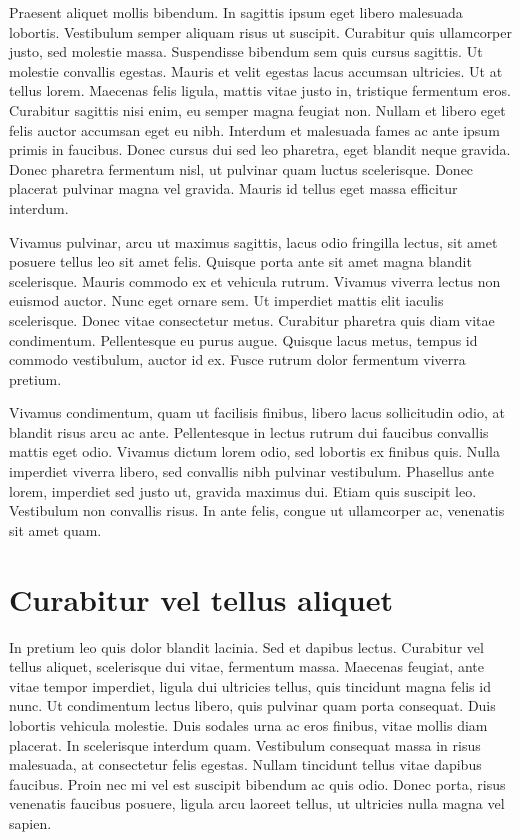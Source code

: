Praesent aliquet mollis bibendum. In sagittis ipsum eget libero malesuada lobortis. Vestibulum semper aliquam risus ut suscipit. Curabitur quis ullamcorper justo, sed molestie massa. Suspendisse bibendum sem quis cursus sagittis. Ut molestie convallis egestas. Mauris et velit egestas lacus accumsan ultricies. Ut at tellus lorem. Maecenas felis ligula, mattis vitae justo in, tristique fermentum eros. Curabitur sagittis nisi enim, eu semper magna feugiat non. Nullam et libero eget felis auctor accumsan eget eu nibh. Interdum et malesuada fames ac ante ipsum primis in faucibus. Donec cursus dui sed leo pharetra, eget blandit neque gravida. Donec pharetra fermentum nisl, ut pulvinar quam luctus scelerisque. Donec placerat pulvinar magna vel gravida. Mauris id tellus eget massa efficitur interdum.

Vivamus pulvinar, arcu ut maximus sagittis, lacus odio fringilla lectus, sit amet posuere tellus leo sit amet felis. Quisque porta ante sit amet magna blandit scelerisque. Mauris commodo ex et vehicula rutrum. Vivamus viverra lectus non euismod auctor. Nunc eget ornare sem. Ut imperdiet mattis elit iaculis scelerisque. Donec vitae consectetur metus. Curabitur pharetra quis diam vitae condimentum. Pellentesque eu purus augue. Quisque lacus metus, tempus id commodo vestibulum, auctor id ex. Fusce rutrum dolor fermentum viverra pretium.

Vivamus condimentum, quam ut facilisis finibus, libero lacus sollicitudin odio, at blandit risus arcu ac ante. Pellentesque in lectus rutrum dui faucibus convallis mattis eget odio. Vivamus dictum lorem odio, sed lobortis ex finibus quis. Nulla imperdiet viverra libero, sed convallis nibh pulvinar vestibulum. Phasellus ante lorem, imperdiet sed justo ut, gravida maximus dui. Etiam quis suscipit leo. Vestibulum non convallis risus. In ante felis, congue ut ullamcorper ac, venenatis sit amet quam.

\section{Curabitur vel tellus aliquet}
In pretium leo quis dolor blandit lacinia. Sed et dapibus lectus. Curabitur vel tellus aliquet, scelerisque dui vitae, fermentum massa. Maecenas feugiat, ante vitae tempor imperdiet, ligula dui ultricies tellus, quis tincidunt magna felis id nunc. Ut condimentum lectus libero, quis pulvinar quam porta consequat. Duis lobortis vehicula molestie. Duis sodales urna ac eros finibus, vitae mollis diam placerat. In scelerisque interdum quam. Vestibulum consequat massa in risus malesuada, at consectetur felis egestas. Nullam tincidunt tellus vitae dapibus faucibus. Proin nec mi vel est suscipit bibendum ac quis odio. Donec porta, risus venenatis faucibus posuere, ligula arcu laoreet tellus, ut ultricies nulla magna vel sapien.

